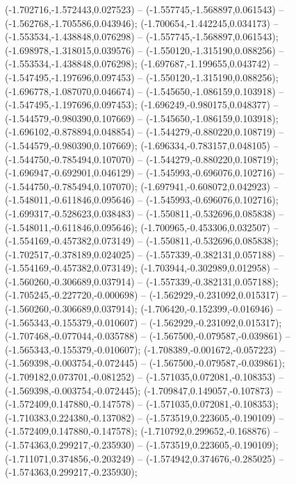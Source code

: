 (-1.702716,-1.572443,0.027523) -- (-1.557745,-1.568897,0.061543) -- (-1.562768,-1.705586,0.043946);
 (-1.700654,-1.442245,0.034173) -- (-1.553534,-1.438848,0.076298) -- (-1.557745,-1.568897,0.061543);
 (-1.698978,-1.318015,0.039576) -- (-1.550120,-1.315190,0.088256) -- (-1.553534,-1.438848,0.076298);
 (-1.697687,-1.199655,0.043742) -- (-1.547495,-1.197696,0.097453) -- (-1.550120,-1.315190,0.088256);
 (-1.696778,-1.087070,0.046674) -- (-1.545650,-1.086159,0.103918) -- (-1.547495,-1.197696,0.097453);
 (-1.696249,-0.980175,0.048377) -- (-1.544579,-0.980390,0.107669) -- (-1.545650,-1.086159,0.103918);
 (-1.696102,-0.878894,0.048854) -- (-1.544279,-0.880220,0.108719) -- (-1.544579,-0.980390,0.107669);
 (-1.696334,-0.783157,0.048105) -- (-1.544750,-0.785494,0.107070) -- (-1.544279,-0.880220,0.108719);
 (-1.696947,-0.692901,0.046129) -- (-1.545993,-0.696076,0.102716) -- (-1.544750,-0.785494,0.107070);
 (-1.697941,-0.608072,0.042923) -- (-1.548011,-0.611846,0.095646) -- (-1.545993,-0.696076,0.102716);
 (-1.699317,-0.528623,0.038483) -- (-1.550811,-0.532696,0.085838) -- (-1.548011,-0.611846,0.095646);
 (-1.700965,-0.453306,0.032507) -- (-1.554169,-0.457382,0.073149) -- (-1.550811,-0.532696,0.085838);
 (-1.702517,-0.378189,0.024025) -- (-1.557339,-0.382131,0.057188) -- (-1.554169,-0.457382,0.073149);
 (-1.703944,-0.302989,0.012958) -- (-1.560260,-0.306689,0.037914) -- (-1.557339,-0.382131,0.057188);
 (-1.705245,-0.227720,-0.000698) -- (-1.562929,-0.231092,0.015317) -- (-1.560260,-0.306689,0.037914);
 (-1.706420,-0.152399,-0.016946) -- (-1.565343,-0.155379,-0.010607) -- (-1.562929,-0.231092,0.015317);
 (-1.707468,-0.077044,-0.035788) -- (-1.567500,-0.079587,-0.039861) -- (-1.565343,-0.155379,-0.010607);
 (-1.708389,-0.001672,-0.057223) -- (-1.569398,-0.003754,-0.072445) -- (-1.567500,-0.079587,-0.039861);
 (-1.709182,0.073701,-0.081252) -- (-1.571035,0.072081,-0.108353) -- (-1.569398,-0.003754,-0.072445);
 (-1.709847,0.149057,-0.107873) -- (-1.572409,0.147880,-0.147578) -- (-1.571035,0.072081,-0.108353);
 (-1.710383,0.224380,-0.137082) -- (-1.573519,0.223605,-0.190109) -- (-1.572409,0.147880,-0.147578);
 (-1.710792,0.299652,-0.168876) -- (-1.574363,0.299217,-0.235930) -- (-1.573519,0.223605,-0.190109);
 (-1.711071,0.374856,-0.203249) -- (-1.574942,0.374676,-0.285025) -- (-1.574363,0.299217,-0.235930);
